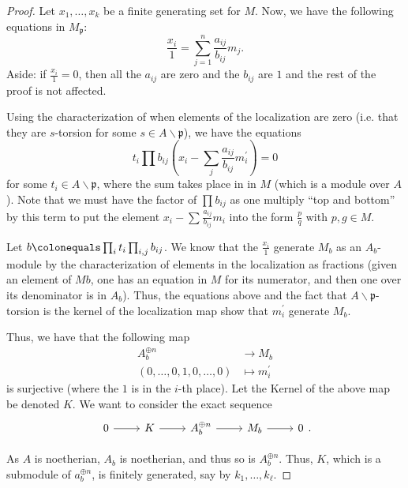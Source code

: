 \documentclass[a4paper]{article}
\begin{document}
\begin{proof}
	Let \(x_{1}, \ldots, x_{k}\) be a finite generating set
	for \(M\).
	Now, we have the following equations in \(M_{\mathfrak{p}}\):
	\[
		\frac{x_{i}}{1} = \sum_{j=1}^{n} \frac{a_{ij}}{b_{ij}} m_{j} 
	.\] 
	Aside: if \(\frac{x_{i}}{1} = 0\), then all the \(a_{ij}\) are zero
	and the \(b_{ij}\) are \(1\) and the rest of the proof is
	not affected.

	Using the characterization of when elements of the localization 
	are zero (i.e. that they are \(s\)-torsion for some 
	\(s \in A \smallsetminus \mathfrak{p} \)),
	we have the equations
	\[
	t_{i}\prod_{}^{} b_{ij}
	\left(x_{i} - \sum_{j}^{} \frac{a_{ij}}{b_{ij}} m^{\prime}_{i}  \right)
	= 0
	\] 
	for some \(t_{i} \in A \smallsetminus \mathfrak{p}\),
	where the sum takes place in
	in \(M\) (which is a module over \(A\)).
	Note that we must have the factor of \(\prod_{}^{} b_{ij} \) as
	one multiply ``top and bottom'' by this term
	to put the element \(x_{i} - \sum_{}^{} \frac{a_{ij}}{b_{ij}}m_{i} \) 
	into the form \(\frac{p}{q}\) with \(p,g \in M\).

	Let \(b \colonequals \prod_{i}^{} t_{i}  \prod_{i,j}^{} b_{ij}\). 
	We know that the \(\frac{x_{i}}{1}\) generate \(M_{b}\) as an
	\(A_{b}\)-module by the characterization of elements in the localization
	as fractions (given an element of \(M {b}\), one has an equation
	in \(M\) for its numerator, and then one over its denominator 
	is in \(A_{b}\)).
	Thus, the equations above and the fact that 
	\(A \smallsetminus \mathfrak{p}\)-torsion is the 
	kernel of the localization map show that
	\(m_{i}^{\prime}\) generate \(M_{b}\). 

	Thus, we have that the following map
	\begin{align*}
		A_{b}^{\oplus n} &\longrightarrow M_{b} \\
		(0,\ldots,0,1,0,\ldots,0) &\longmapsto m_{i}^{\prime}
	\end{align*}
	is surjective (where the \(1\) is in the \(i\)-th place).
	Let the Kernel of the above map be denoted \(K\).
	We want to consider the exact sequence
	\[
	\begin{tikzcd}
	0 \arrow{r}{} & K \arrow{r}{} & 
	A_{b}^{\oplus n} \arrow{r}{} & M_{b} \arrow{r}{} & 0
	\end{tikzcd}
	.\]
	
	As \(A\) is noetherian, \(A_{b}\) is noetherian,
	and thus so is \(A_{b}^{\oplus n}\).
	Thus, \(K\), which is a submodule of \(a_{b}^{\oplus n}\),
	is finitely generated, say by 
	\(k_{1}, \ldots, k_{\ell}\).
	

\end{proof}
\end{document}
